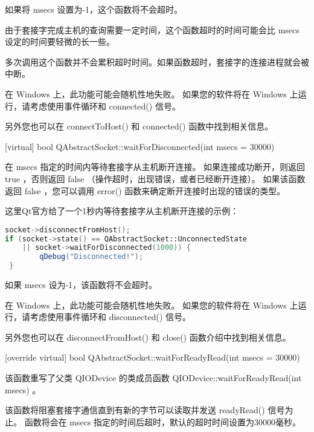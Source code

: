 如果将 msecs 设置为-1，这个函数将不会超时。

\begin{notice}
由于套接字完成主机的查询需要一定时间，这个函数超时的时间可能会比 msecs 设定的时间要轻微的长一些。
\end{notice}


\begin{notice}
多次调用这个函数并不会累积超时时间。如果函数超时，套接字的连接进程就会被中断。
\end{notice}

\begin{notice}
在 Windows 上，此功能可能会随机性地失败。 如果您的软件将在 Windows 上运行，请考虑使用事件循环和 connected() 信号。
\end{notice}

另外您也可以在 connectToHost() 和 connected() 函数中找到相关信息。

\splitLine

[virtual] bool QAbstractSocket::waitForDisconnected(int msecs = 30000)

在 msecs 指定的时间内等待套接字从主机断开连接。 如果连接成功断开，则返回 true ，否则返回 false （操作超时，出现错误，或者已经断开连接）。 如果该函数返回 false ，您可以调用 error() 函数来确定断开连接时出现的错误的类型。

这里Qt官方给了一个1秒内等待套接字从主机断开连接的示例：

\begin{lstlisting}[language=C++]
socket->disconnectFromHost();
if (socket->state() == QAbstractSocket::UnconnectedState
	|| socket->waitForDisconnected(1000)) {
		qDebug("Disconnected!");
 }
\end{lstlisting}

如果 msecs 设为-1，该函数将不会超时。

\begin{notice}
在 Windows 上，此功能可能会随机性地失败。 如果您的软件将在 Windows 上运行，请考虑使用事件循环和 disconnected() 信号。
\end{notice}


另外您也可以在 disconnectFromHost() 和 close() 函数介绍中找到相关信息。

\splitLine

[override virtual] bool QAbstractSocket::waitForReadyRead(int msecs =
30000)

该函数重写了父类 QIODevice 的类成员函数 QIODevice::waitForReadyRead(int msecs) 。

该函数将阻塞套接字通信直到有新的字节可以读取并发送 readyRead() 信号为止。 函数将会在 msecs 指定的时间后超时，默认的超时时间设置为30000毫秒。

